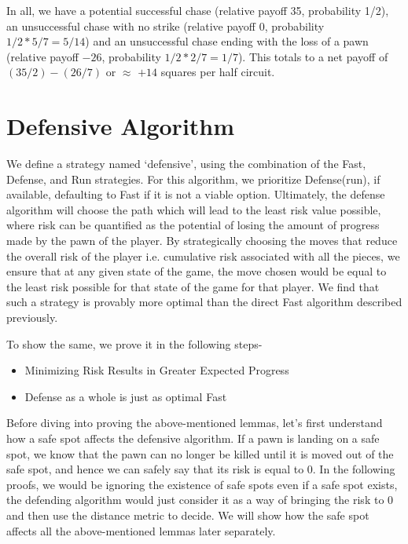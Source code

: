 \documentclass{article} %
\begin{document}
In all, we have a potential successful chase (relative payoff 35, probability 1/2), an unsuccessful chase with no strike (relative payoff 0, probability $1/2*5/7 = 5/14$) and an unsuccessful chase ending with the loss of a pawn (relative payoff $-26$, probability $1/2*2/7 = 1/7$). This totals to a net payoff of $(35/2) - (26/7)$ or $\approx$ $+14$ squares per half circuit.


\section{Defensive Algorithm}
We define a strategy named ‘defensive’, using the combination of the Fast, Defense, and Run strategies. For this algorithm, we prioritize Defense(run), if available, defaulting to Fast if it is not a viable option. Ultimately, the defense algorithm will choose the path which will lead to the least risk value possible, where risk can be quantified as the potential of losing the amount of progress made by the pawn of the player. By strategically choosing the moves that reduce the overall risk of the player i.e. cumulative risk associated with all the pieces, we ensure that at any given state of the game, the move chosen would be equal to the least risk possible for that state of the game for that player. We find that such a strategy is provably more optimal than the direct Fast algorithm described previously. 

	To show the same, we prove it in the following steps-
 \begin{itemize}
     \item Minimizing Risk Results in Greater Expected Progress
\item Defense as a whole is just as optimal Fast

 \end{itemize}

 Before diving into proving the above-mentioned lemmas, let's first understand how a safe spot affects the defensive algorithm. If a pawn is landing on a safe spot, we know that the pawn can no longer be killed until it is moved out of the safe spot, and hence we can safely say that its risk is equal to 0. In the following proofs, we would be ignoring the existence of safe spots even if a safe spot exists, the defending algorithm would just consider it as a way of bringing the risk to 0 and then use the distance metric to decide. We will show how the safe spot affects all the above-mentioned lemmas later separately.
\end{document}
